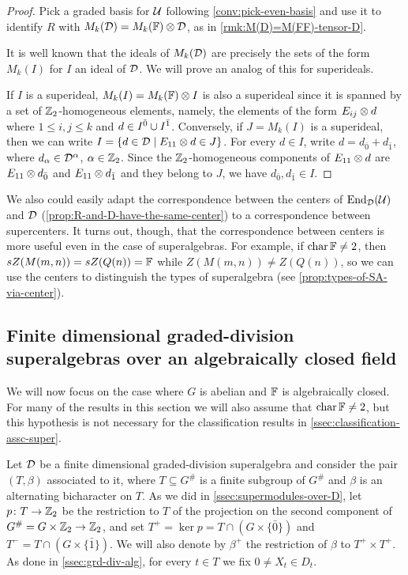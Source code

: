 \begin{proof}
    Pick a graded basis for $\mathcal U$ following \cref{conv:pick-even-basis} and use it to identify $R$ with $M_k(\mathcal{D}) = M_k(\mathbb{F}) \otimes \mathcal{D}$, as in \cref{rmk:M(D)=M(FF)-tensor-D}.

	It is well known that the ideals of $M_k(\mathcal{D})$ are precisely the sets of the form $M_k(I)$ for $I$ an ideal of $\mathcal{D}$.
	We will prove an analog of this for superideals.

	If $I$ is a superideal, $M_k(I) = M_k(\mathbb{F}) \otimes I$ is also a superideal since it is spanned by a set of $\mathbb{Z}_2$-homogeneous elements, namely, the elements of the form $E_{ij}\otimes d$ where $1 \leq i,j \leq k$ and $d \in I^{\bar0} \cup I^{\bar1}$.
	Conversely, if $J = M_k(I)$ is a superideal, then we can write $I = \{ d\in  \mathcal{D} \mid E_{11}\otimes d \in J\}$.
	For every $d\in I$, write $d = d_{\bar 0} + d_{\bar 1}$, where $d_\alpha \in \mathcal{D}^\alpha$, $\alpha \in \mathbb{Z}_2$.
	Since the $\mathbb{Z}_2$-homogeneous components of $E_{11}\otimes d$ are $E_{11}\otimes d_{\bar 0}$ and $E_{11}\otimes d_{\bar 1}$ and they belong to $J$, we have $d_{\bar 0}, d_{\bar 1} \in I$.
\end{proof}

We also could easily adapt the correspondence between the centers of $\operatorname{End}_{\mathcal{D}} (\mathcal U)$ and $\mathcal{D}$ (\cref{prop:R-and-D-have-the-same-center}) to a correspondence between supercenters. 
It turns out, though, that the correspondence between centers is more useful even in the case of superalgebras. 
For example, if $\operatorname{char} \mathbb{F} \neq 2$, then $sZ(M(m,n)) = sZ(Q(n)) = \mathbb{F}$ while $Z(M(m,n)) \neq Z(Q(n))$, so we can use the centers to distinguish the types of superalgebra (see \cref{prop:types-of-SA-via-center}). 

\subsection{Finite dimensional graded-division superalgebras over an algebraically closed field}\label{ssec:T-beta-p}

We will now focus on the case where $G$ is abelian and $\mathbb{F}$ is algebraically closed. 
For many of the results in this section we will also assume that $\operatorname{char} \mathbb{F} \neq 2$, but this hypothesis is not necessary for the classification results in \cref{ssec:classification-assc-super}.

Let $\mathcal{D}$ be a finite dimensional graded-division superalgebra and consider the pair $(T, \beta)$ associated to it, where $T \subseteq G^\#$ is a finite subgroup of $G^\#$ and $\beta$ is an alternating bicharacter on $T$. 
As we did in \cref{ssec:supermodules-over-D}, let $p\colon T \to \mathbb{Z}_2$ be the restriction to $T$ of the projection on the second component of $G^\# = G\times \mathbb{Z}_2 \to \mathbb{Z}_2$, and set $T^+ = \ker p = T \cap (G \times \{ \bar 0 \})$ and $T^- = T \cap (G \times \{ \bar 1 \})$. 
We will also denote by $\beta^+$ the restriction of $\beta$ to $T^+ \times T^+$. 
As done in \cref{ssec:grd-div-alg}, for every $t\in T$ we fix $0 \neq X_t\in D_t$.

